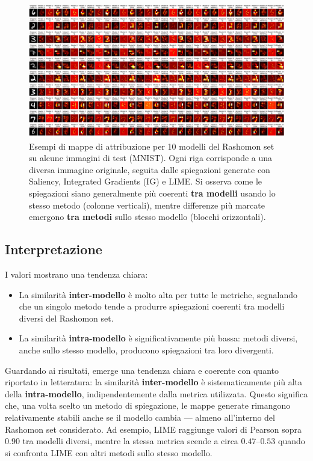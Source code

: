 \documentclass{article}
\begin{document}
\begin{figure}[h!]
      \centering
      \includegraphics[width=\textwidth]{images/visualizzazione (2).png}
      \caption{Esempi di mappe di attribuzione per 10 modelli del Rashomon set su alcune immagini di test (MNIST).
            Ogni riga corrisponde a una diversa immagine originale, seguita dalle spiegazioni generate con Saliency, Integrated Gradients (IG) e LIME.
            Si osserva come le spiegazioni siano generalmente più coerenti \textbf{tra modelli} usando lo stesso metodo (colonne verticali),
            mentre differenze più marcate emergono \textbf{tra metodi} sullo stesso modello (blocchi orizzontali).}
      \label{fig:similarity_examples}
\end{figure}

\subsection{Interpretazione}
I valori mostrano una tendenza chiara:
\begin{itemize}
      \item La similarità \textbf{inter-modello} è molto alta per tutte le metriche,
            segnalando che un singolo metodo tende a produrre spiegazioni coerenti tra
            modelli diversi del Rashomon set.
      \item La similarità \textbf{intra-modello} è significativamente più bassa: metodi
            diversi, anche sullo stesso modello, producono spiegazioni tra loro divergenti.
\end{itemize}

Guardando ai risultati, emerge una tendenza chiara e coerente con quanto
riportato in letteratura: la similarità \textbf{inter-modello} è
sistematicamente più alta della \textbf{intra-modello}, indipendentemente dalla
metrica utilizzata. Questo significa che, una volta scelto un metodo di
spiegazione, le mappe generate rimangono relativamente stabili anche se il
modello cambia — almeno all’interno del Rashomon set considerato. Ad esempio,
LIME raggiunge valori di Pearson sopra $0.90$ tra modelli diversi, mentre la
stessa metrica scende a circa $0.47$–$0.53$ quando si confronta LIME con altri
metodi sullo stesso modello.\\
\end{document}
